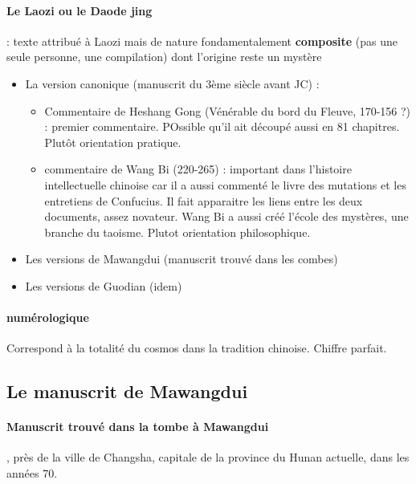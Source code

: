 \paragraph{Le Laozi ou le Daode jing} : texte attribué à Laozi mais de nature fondamentalement \textbf{composite} (pas une seule personne, une compilation) dont l’origine reste un mystère
\begin{itemize}
    \item 	La version canonique (manuscrit du 3ème siècle avant JC) : 
    \begin{itemize}
        \item Commentaire de Heshang Gong (Vénérable du bord du Fleuve, 170-156 ?) : premier commentaire. POssible qu'il ait découpé aussi en 81 chapitres. Plutôt orientation pratique.
        \item commentaire de Wang Bi (220-265) : important dans l'histoire intellectuelle chinoise car il a aussi commenté le livre des mutations et les entretiens de Confucius. Il fait apparaitre les liens entre les deux documents, assez novateur. Wang Bi a aussi créé l'école des mystères, une branche du taoisme.  Plutot orientation philosophique. 
        
    \end{itemize}

    \item 	Les versions de Mawangdui (manuscrit trouvé dans les combes)

    \item 	Les versions de Guodian (idem)
\end{itemize}


\paragraph{numérologique}
\begin{Prop}[81]
    Correspond à la totalité du cosmos dans la tradition chinoise. Chiffre parfait.  
\end{Prop}


\subsection{Le manuscrit de Mawangdui}

\paragraph{Manuscrit trouvé dans la tombe à Mawangdui} , près de la ville de Changsha, capitale de la province du Hunan actuelle, dans les années 70. 

